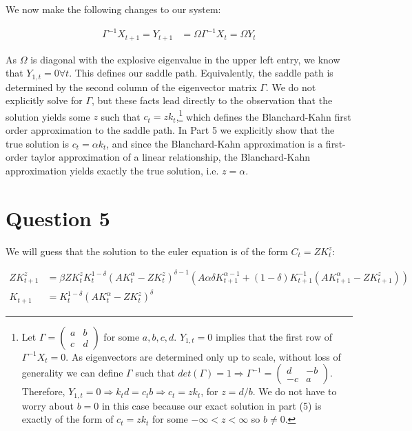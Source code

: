 \documentclass[11pt]{article} %
\begin{document}
We now make the following changes to our system:

\begin{align*}
\Gamma^{-1} X_{t+1} = Y_{t+1} &= \Omega\Gamma^{-1} X_{t} = \Omega Y_{t}
\end{align*}

As $\Omega$ is diagonal with the explosive eigenvalue in the upper left entry, we know that $Y_{1,t} = 0 \forall t$. This defines our saddle path. Equivalently, the saddle path is determined by the second column of the eigenvector matrix $\Gamma$. We do not explicitly solve for $\Gamma$, but these facts lead directly to the observation that the solution yields some $z$ such that $c_t = z k_t$,\footnote{Let $\Gamma = \begin{pmatrix} a & b\\ c  & d \end{pmatrix}$ for some $a,b,c,d.$ $Y_{1,t} = 0$ implies that the first row of $\Gamma^{-1}X_{t} = 0.$ As eigenvectors are determined only up to scale, without loss of generality we can define $\Gamma $ such that $det(\Gamma) = 1 \Rightarrow \Gamma^{-1} =  \begin{pmatrix} d & -b\\ -c  & a \end{pmatrix}$. Therefore, $Y_{1,t} = 0 \Rightarrow k_{t}d = c_tb \Rightarrow  c_t = zk_t$, for $z = d/b$. We do not have to worry about $b = 0$ in this case because our exact solution in part (5) is exactly of the form of $c_t = zk_t$ for some $-\infty<z<\infty$ so $b\neq 0.$ } which defines the Blanchard-Kahn first order approximation to the saddle path. In Part 5 we explicitly show that the true solution is $c_t = \alpha k_t$, and since the Blanchard-Kahn approximation is a first-order taylor approximation of a linear relationship, the Blanchard-Kahn approximation yields exactly the true solution, i.e. $z = \alpha.$

\section{Question 5}
We will guess that the solution to the euler equation is of the form $C_t = ZK_t^z$:

\begin{align*}
ZK_{t+1}^z&= \beta  ZK_t^{z} K_t^{1-\delta}(AK_t^{\alpha} -  ZK_t^{z})^{\delta - 1}(A\alpha \delta K_{t+1}^{\alpha - 1}  + (1-\delta)K_{t+1}^{-1}(AK_{t+1}^{\alpha} -  ZK_{t+1}^{z}) )\\
K_{t+1} &= K_t^{1-\delta}(AK_t^{\alpha} -  ZK_t^{z})^{\delta}
\end{align*}
\end{document}
